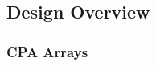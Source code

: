 

\subsection{Design Overview}
\label{sec:fdsp-hv-des}

\subsubsection{CPA Arrays}
\label{sec:fdsp-hv-des-cpa}

